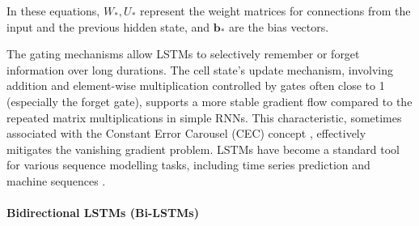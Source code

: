 In these equations, \( W_*, U_* \) represent the weight matrices for connections from the input and the previous hidden state, and \( \bm{b}_* \) are the bias vectors.

The gating mechanisms allow LSTMs to selectively remember or forget information over long durations. The cell state's update mechanism, involving addition and element-wise multiplication controlled by gates often close to 1 (especially the forget gate), supports a more stable gradient flow compared to the repeated matrix multiplications in simple RNNs. This characteristic, sometimes associated with the Constant Error Carousel (CEC) concept \autocite{hochreiter1997long}, effectively mitigates the vanishing gradient problem. LSTMs have become a standard tool for various sequence modelling tasks, including time series prediction and machine sequences \autocite{al2024rnn}.


\paragraph{\textbf{Bidirectional LSTMs (Bi-LSTMs)}}
\label{sec:bilstm}

